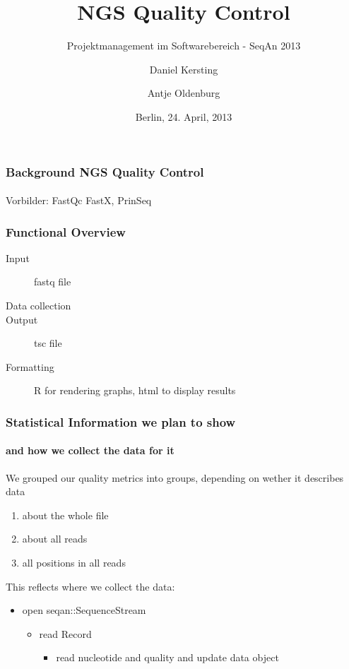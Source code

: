 \documentclass{beamer}
\begin{document}
\title{NGS Quality Control}
\subtitle{Projektmanagement im Softwarebereich - SeqAn 2013}
\author{Daniel Kersting \and Antje Oldenburg}
\date{Berlin, 24. April, 2013}
\subject{Informatik}

\frame{\titlepage}

\begin{frame}
  \frametitle{Background NGS Quality Control}
  \framesubtitle{}
Vorbilder: FastQc FastX, PrinSeq
\end{frame}

\begin{frame}
  \frametitle{Functional Overview}
  \begin{description}
   \item[Input] fastq file
   \item[Data collection] 
   \item[Output] tsc file
   \item[Formatting] R for rendering graphs, html to display results 
  \end{description}
\end{frame}



\begin{frame}
 \frametitle{ Statistical Information we plan to show}
 \framesubtitle{and how we collect the data for it}

 We grouped our quality metrics into groups, depending on 
 wether it describes data 

 \begin{enumerate}
  \item about the whole file
  \item about all reads
  \item all positions in all reads 
 \end{enumerate}

This reflects where we collect the data:
\begin{itemize}
\item open seqan::SequenceStream
  \begin{itemize}
  \item read Record
    \begin{itemize}
    \item read nucleotide and quality and update data object
    \end{itemize}
  \end{itemize}
\end{itemize}
 
\end{frame}
\end{document}
